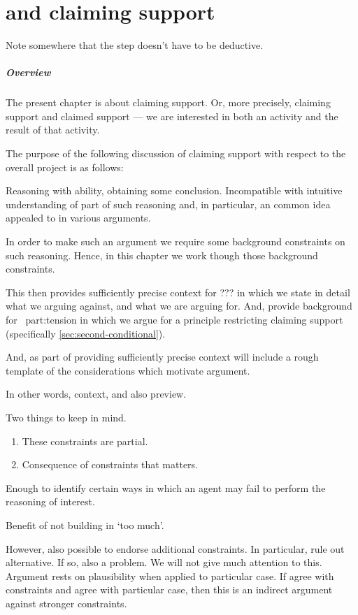 \chapter{ and claiming support}
\label{cha:claiming-support}

\begin{note}
  \color{red}
  Note somewhere that the step doesn't have to be deductive.
\end{note}

\paragraph*{Overview}

\begin{note}
  The present chapter is about claiming support.
  Or, more precisely, claiming support and claimed support --- we are interested in both an activity and the result of that activity.

  The purpose of the following discussion of claiming support with respect to the {\color{red} overall project} is as follows:

  Reasoning with ability, obtaining some conclusion.
  Incompatible with intuitive understanding of part of such reasoning and, in particular, an common idea appealed to in various arguments.

  In order to make such an argument we require some background constraints on such reasoning.
  Hence, in this chapter we work though those background constraints.

  This then provides sufficiently precise context for {\color{red} ???} in which we state in detail what we arguing against, and what we are arguing for.
  And, provide background for~{\color{red} part:tension} in which we argue for a principle restricting claiming support (specifically \autoref{sec:second-conditional}).

  And, as part of providing sufficiently precise context will include a rough template of the considerations which motivate argument.

  In other words, context, and also preview.
\end{note}

\begin{note}
  Two things to keep in mind.

  \begin{enumerate}
  \item These constraints are partial.
  \item Consequence of constraints that matters.
  \end{enumerate}

  Enough to identify certain ways in which an agent may fail to perform the reasoning of interest.

  Benefit of not building in `too much'.

  However, also possible to endorse additional constraints.
  In particular, rule out alternative.
  If so, also a problem.
  We will not give much attention to this.
  Argument rests on plausibility when applied to particular case.
  If agree with constraints and agree with particular case, then this is an indirect argument against stronger constraints.
\end{note}

